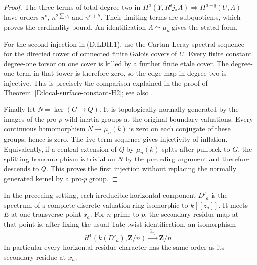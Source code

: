 \begin{proof}
The three terms of total degree two in
$H^a(Y,R^qj_*\Lambda)\Rightarrow H^{a+q}(U,\Lambda)$ have
orders $n^v$, $n^{2\sum g_i}$ and $n^{e+h}$. Their limiting
terms are subquotients, which proves the cardinality bound.
An identification $\Lambda\simeq\mu_n$ gives the stated form.

For the second injection in (D.LDH.1), use the Cartan--Leray
spectral sequence for the directed tower of connected finite
Galois covers of $U$. Every finite constant degree-one torsor
on one cover is killed by a further finite etale cover.
The degree-one term in that tower is therefore zero, so the
edge map in degree two is injective. This is precisely the
comparison explained in the proof of
Theorem~\ref{D:local-surface-constant-H2}; see also
\citep[Theorem~14.9 and Remark~14.10, complete written passage]
{MilneLEC2013H2D}.

Finally let $N=\ker(G\to Q)$. It is topologically normally
generated by the images of the pro-$p$ wild inertia groups
at the original boundary valuations. Every continuous
homomorphism $N\to\mu_n(k)$ is zero on each conjugate of
these groups, hence is zero. The five-term sequence gives
injectivity of inflation. Equivalently, if a central extension
of $Q$ by $\mu_n(k)$ splits after pullback to $G$, the splitting
homomorphism is trivial on $N$ by the preceding argument and
therefore descends to $Q$. This proves the first injection
without replacing the normally generated kernel by a pro-$p$
group.
\end{proof}

\begin{lemma}
\label{D:horizontal-residue-order-at-node}
In the preceding setting, each irreducible horizontal component
$D'_a$ is the spectrum of a complete discrete valuation ring
isomorphic to $k[[z_a]]$. It meets $E$ at one transverse point
$x_a$. For $n$ prime to $p$, the secondary-residue map at that
point is, after fixing the usual Tate-twist identification,
an isomorphism
\[
 H^1(k(D'_a),\mathbf Z/n)\xrightarrow{\ \partial_{x_a}\ }
                                \mathbf Z/n.
 \tag{D.LDH.4}
\]
In particular every horizontal residue character has the same
order as its secondary residue at $x_a$.
\end{lemma}

